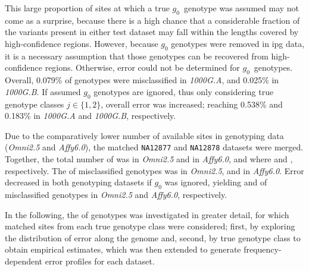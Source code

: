 This large proportion of sites at which a true $g_0$~genotype was assumed may not come as a surprise, because there is a high chance that a considerable fraction of the variants present in either test dataset may fall within the lengths covered by high-confidence regions.
However, because $g_0$ genotypes were removed in \gls{ipg} data, it is a necessary assumption that those genotypes can be recovered from high-confidence regions.
Otherwise, error could not be determined for $g_0$~genotypes.
Overall, 0.079\% of genotypes were misclassified in \emph{1000G.A}, and 0.025\% in \emph{1000G.B}.
If assumed $g_0$ genotypes are ignored, thus only considering true genotype classes ${j \in \lbrace 1,2 \rbrace}$, overall error was increased; reaching 0.538\% and 0.183\% in \emph{1000G.A} and \emph{1000G.B}, respectively.

Due to the comparatively lower number of available sites in genotyping data (\emph{Omni2.5} and \emph{Affy6.0}), the matched \texttt{NA12877} and \texttt{NA12878} datasets were merged.
Together, the total number of  was  in \emph{Omni2.5} and  in \emph{Affy6.0}, and where  and  , respectively.
The  of misclassified genotypes was  in \emph{Omni2.5}, and  in \emph{Affy6.0}.
Error decreased in both genotyping datasets if $g_0$ was ignored, yielding  and  of misclassified genotypes in \emph{Omni2.5} and \emph{Affy6.0}, respectively.


In the following, the  of genotypes was investigated in greater detail, for which matched sites from each true genotype class were considered; first, by exploring the distribution of error along the genome and, second, by true genotype class to obtain empirical  estimates, which was then extended to generate frequency-dependent error profiles for each dataset.


